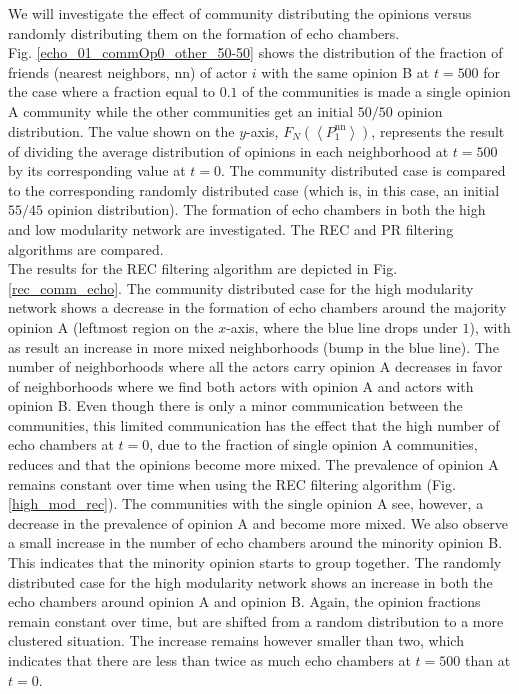 \documentclass[11 pt , letterpaper , twoside , openright]{book}
\begin{document}
We will investigate the effect of community distributing the opinions versus randomly distributing them on the formation of echo chambers. \\
\newline
Fig. \ref{echo_01_commOp0_other_50-50} shows the distribution of the fraction of friends (nearest neighbors, nn) of actor $i$ with the same opinion B at $t=500$ for the case where a fraction equal to $0.1$ of the communities is made a single opinion A community while the other communities get an initial $50/50$ opinion distribution. The value shown on the $y$-axis, $F_N(\left<P_1^{\text{nn}}\right>)$, represents the result of dividing the average distribution of opinions in each neighborhood at $t=500$ by its corresponding value at $t=0$. The community distributed case is compared to the corresponding randomly distributed case (which is, in this case, an initial $55/45$ opinion distribution). The formation of echo chambers in both the high and low modularity network are investigated. The REC and PR filtering algorithms are compared. \\
\newline
The results for the REC filtering algorithm are depicted in Fig. \ref{rec_comm_echo}. The community distributed case for the high modularity network shows a decrease in the formation of echo chambers around the majority opinion A (leftmost region on the $x$-axis, where the blue line drops under $1$), with as result an increase in more mixed neighborhoods (bump in the blue line). The number of neighborhoods where all the actors carry opinion A decreases in favor of neighborhoods where we find both actors with opinion A and actors with opinion B. Even though there is only a minor communication between the communities, this limited communication has the effect that the high number of echo chambers at $t=0$, due to the fraction of single opinion A communities, reduces and that the opinions become more mixed. The prevalence of opinion A remains constant over time when using the REC filtering algorithm (Fig. \ref{high_mod_rec}). The communities with the single opinion A see, however, a decrease in the prevalence of opinion A and become more mixed. We also observe a small increase in the number of echo chambers around the minority opinion B. This indicates that the minority opinion starts to group together. The randomly distributed case for the high modularity network shows an increase in both the echo chambers around opinion A and opinion B. Again, the opinion fractions remain constant over time, but are shifted from a random distribution to a more clustered situation. The increase remains however smaller than two, which indicates that there are less than twice as much echo chambers at $t=500$ than at $t=0$.\\
\end{document}
